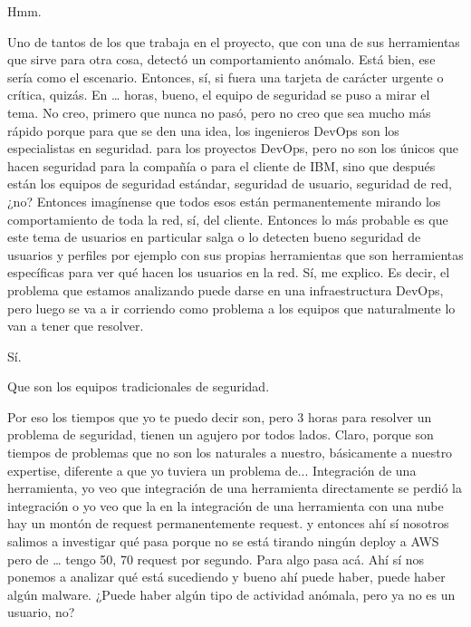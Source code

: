 \begin{description}[leftmargin=0cm, labelsep=0.5cm]
    \item[\textbf{MOCIULSKY SANTIAGO:}] Hmm.

    \item[\textbf{VILLARINO PABLO RODOLFO:}] Uno de tantos de los que trabaja en el proyecto, que con una de sus herramientas que sirve para otra cosa, detectó un comportamiento anómalo. Está bien, ese sería como el escenario. Entonces, sí, si fuera una tarjeta de carácter urgente o crítica, quizás. En … horas, bueno, el equipo de seguridad se puso a mirar el tema. No creo, primero que nunca no pasó, pero no creo que sea mucho más rápido porque para que se den una idea, los ingenieros DevOps son los especialistas en seguridad. para los proyectos DevOps, pero no son los únicos que hacen seguridad para la compañía o para el cliente de IBM, sino que después están los equipos de seguridad estándar, seguridad de usuario, seguridad de red, ¿no? Entonces imagínense que todos esos están permanentemente mirando los comportamiento de toda la red, sí, del cliente. Entonces lo más probable es que este tema de usuarios en particular salga o lo detecten bueno seguridad de usuarios y perfiles por ejemplo con sus propias herramientas que son herramientas específicas para ver qué hacen los usuarios en la red. Sí, me explico. Es decir, el problema que estamos analizando puede darse en una infraestructura DevOps, pero luego se va a ir corriendo como problema a los equipos que naturalmente lo van a tener que resolver.

    \item[\textbf{MOCIULSKY SANTIAGO:}] Sí.

    \item[\textbf{VILLARINO PABLO RODOLFO:}] Que son los equipos tradicionales de seguridad.

    \item[\textbf{VILLARINO PABLO RODOLFO:}] Por eso los tiempos que yo te puedo decir son, pero 3 horas para resolver un problema de seguridad, tienen un agujero por todos lados. Claro, porque son tiempos de problemas que no son los naturales a nuestro, básicamente a nuestro expertise, diferente a que yo tuviera un problema de... Integración de una herramienta, yo veo que integración de una herramienta directamente se perdió la integración o yo veo que la en la integración de una herramienta con una nube hay un montón de request permanentemente request. y entonces ahí sí nosotros salimos a investigar qué pasa porque no se está tirando ningún deploy a AWS pero de … tengo 50, 70 request por segundo. Para algo pasa acá. Ahí sí nos ponemos a analizar qué está sucediendo y bueno ahí puede haber, puede haber algún malware. ¿Puede haber algún tipo de actividad anómala, pero ya no es un usuario, no?


\end{description}
